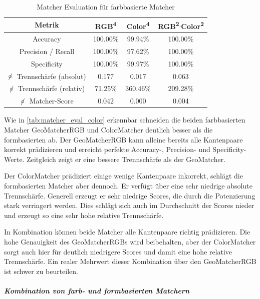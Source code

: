 \begin{table}
    \centering
    \begin{tabular}{||c|ccc||}
        \hline
        Metrik & RGB\textsuperscript{4} & Color\textsuperscript{4} & RGB\textsuperscript{2}$\cdot$Color\textsuperscript{2} \\
        \hline\hline
        Accuracy                                 & 100.00\% & 99.94\%  & 100.00\%  \\
        Precision / Recall                       & 100.00\% & 97.62\%  & 100.00\%  \\
        Specificity                              & 100.00\% & 99.97\%  & 100.00\%  \\
        $\not\!\circ \;$ Trennschärfe (absolut)  & 0.177   & 0.017   & 0.063    \\
        $\not\!\circ \;$ Trennschärfe (relativ)  & 71.25\%  & 360.46\% & 209.28\%  \\
        $\not\!\circ \;$ Matcher-Score           & 0.042   & 0.000   & 0.004    \\
        \hline
    \end{tabular}
    \caption{Matcher Evaluation für farbbasierte Matcher}
    \label{tab:matcher_eval_color}
\end{table}

Wie in \autoref{tab:matcher_eval_color} erkennbar schneiden die beiden farbbasierten 
Matcher GeoMatcherRGB und ColorMatcher deutlich besser als die formbasierten ab. 
Der GeoMatcherRGB kann alleine bereits alle
Kantenpaare korrekt prädizieren und erreicht perfekte Accuracy-,
Precision- und Specificity-Werte. Zeitgleich zeigt er eine bessere
Trennschärfe als der GeoMatcher.

Der ColorMatcher prädiziert einige wenige Kantenpaare inkorrekt, schlägt
die formbasierten Matcher aber dennoch. Er verfügt über eine sehr
niedrige absolute Trennschärfe. Generell erzeugt er sehr niedrige
Scores, die durch die Potenzierung stark verringert werden. Dies schlägt
sich auch im Durchschnitt der Scores nieder und erzeugt so eine sehr
hohe relative Trennschärfe.

In Kombination können beide Matcher alle Kantenpaare richtig
prädizieren. Die hohe Genauigkeit des GeoMatcherRGBs wird beibehalten,
aber der ColorMatcher sorgt auch hier für deutlich niedrigere Scores und
damit eine hohe relative Trennschärfe. Ein realer Mehrwert dieser
Kombination über den GeoMatcherRGB ist schwer zu beurteilen.

\subparagraph{Kombination von farb- und formbasierten Matchern}


